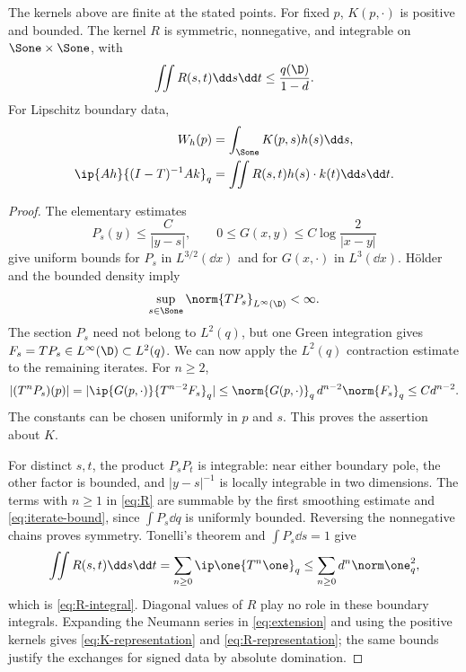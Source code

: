 \begin{lemma}\label{lem:kernel-estimates}
The kernels above are finite at the stated points. For fixed $p$, $K(p,\cdot)$ is positive and bounded. The kernel $R$ is symmetric, nonnegative, and integrable on $\Sone\times\Sone$, with
\begin{equation}\label{eq:R-integral}
\iint R(s,t)\dd s\dd t\le\frac{q(\D)}{1-d}.
\end{equation}
For Lipschitz boundary data,
\begin{align}
W_h(p)&=\int_{\Sone}K(p,s)h(s)\dd s,\label{eq:K-representation}\\
\ip{Ah}{(I-T)^{-1}Ak}_q
&=\iint R(s,t)h(s)\cdot k(t)\dd s\dd t.\label{eq:R-representation}
\end{align}
\end{lemma}
\begin{proof}
The elementary estimates
\[
P_s(y)\le\frac C{|y-s|},\qquad
0\le G(x,y)\le C\log\frac2{|x-y|}
\]
give uniform bounds for $P_s$ in $L^{3/2}(\dd x)$ and for $G(x,\cdot)$ in $L^3(\dd x)$. H\"older and the bounded density imply
\[
\sup_{s\in\Sone}\norm{TP_s}_{L^\infty(\D)}<\infty.
\]
The section $P_s$ need not belong to $L^2(q)$, but one Green integration gives $F_s=TP_s\in L^\infty(\D)\subset L^2(q)$. We can now apply the $L^2(q)$ contraction estimate to the remaining iterates. For $n\ge2$,
\begin{equation}\label{eq:iterate-bound}
|(T^nP_s)(p)|
=|\ip{G(p,\cdot)}{T^{n-2}F_s}_q|
\le\norm{G(p,\cdot)}_q\,d^{n-2}\norm{F_s}_q
\le C d^{n-2}.
\end{equation}
The constants can be chosen uniformly in $p$ and $s$. This proves the assertion about $K$.

For distinct $s,t$, the product $P_sP_t$ is integrable: near either boundary pole, the other factor is bounded, and $|y-s|^{-1}$ is locally integrable in two dimensions. The terms with $n\ge1$ in \eqref{eq:R} are summable by the first smoothing estimate and \eqref{eq:iterate-bound}, since $\int P_s\dd q$ is uniformly bounded. Reversing the nonnegative chains proves symmetry. Tonelli's theorem and $\int P_s\dd s=1$ give
\[
\iint R(s,t)\dd s\dd t
=\sum_{n\ge0}\ip\one{T^n\one}_q
\le\sum_{n\ge0}d^n\norm\one_q^2,
\]
which is \eqref{eq:R-integral}. Diagonal values of $R$ play no role in these boundary integrals. Expanding the Neumann series in \eqref{eq:extension} and using the positive kernels gives \eqref{eq:K-representation} and \eqref{eq:R-representation}; the same bounds justify the exchanges for signed data by absolute domination.
\end{proof}

